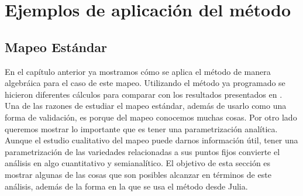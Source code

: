 
\chapter{Ejemplos de aplicación del método}
\label{SeccionEstandar}\section{Mapeo Estándar}
En el capítulo anterior ya mostramos cómo se aplica el método de manera algebráica para el caso de este mapeo. Utilizando el método ya programado se hicieron diferentes cálculos para comparar con los resultados presentados en \citep{Mireles}. Una de las razones de estudiar el mapeo estándar, además de usarlo como una forma de validación, es porque del mapeo conocemos muchas cosas. Por otro lado queremos mostrar lo importante que es tener una parametrización analítica. Aunque el estudio cualitativo del mapeo puede darnos información útil, tener una parametrización de las variedades relacionadas a sus puntos fijos convierte el análisis en algo cuantitativo y semianalítico. El objetivo de esta sección es mostrar algunas de las cosas que son posibles alcanzar en términos de este análisis, además de la forma en la que se usa el método desde Julia.\\

